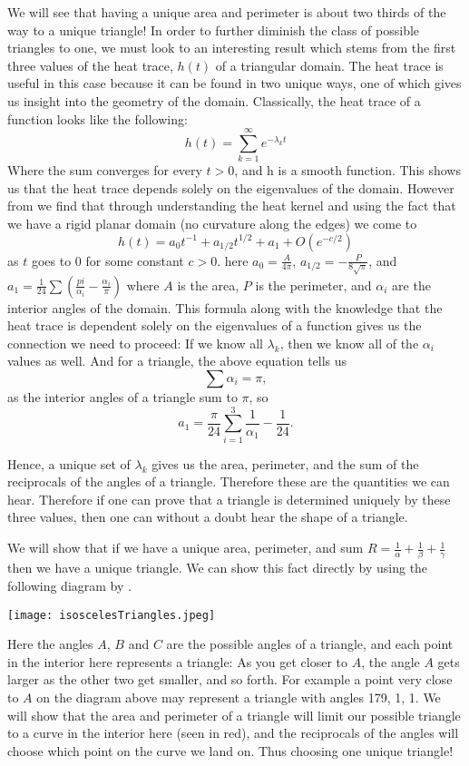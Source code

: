 \documentclass[12pt]{report}
\numberwithin{definition}{section}
\begin{document}
We will see that having a unique area and perimeter is about two thirds of the way to a unique triangle! In order to further diminish the class of possible triangles to one, we must look to an interesting result which stems from the first three values of the heat trace, $h(t)$ of a triangular domain. The heat trace is useful in this case because it can be found in two unique ways, one of which gives us insight into the geometry of the domain. Classically, the heat trace of a function looks like the following:
\[
h(t) = \sum^\infty_{k=1} e^{-\lambda_kt}
\]
 Where the sum converges for every $t>0$, and h is a smooth function. This shows us that the heat trace depends solely on the eigenvalues of the domain. However from \cite{Van} we find that through understanding the heat kernel and using the fact that  we have a rigid planar domain (no curvature along the edges) we come to 
\[
h(t) = a_0t^{-1}+a_{1/2}t^{1/2}+a_1+O(e^{-c/2} )
\]
as $t$ goes to $0$ for some constant $c>0$. here $a_0 = \frac{A}{4\pi}$, $a_{1/2} = -\frac{P}{8\sqrt{\pi}}$, and $a_1 = \frac{1}{24}\sum(\frac{pi}{\alpha_i}-\frac{\alpha_i}{\pi})$ where $A$ is the area, $P$ is the perimeter, and $\alpha_i$ are the interior angles of the domain. This formula along with the knowledge that the heat trace is dependent solely on the eigenvalues of a function gives us the connection we need to proceed: 
If we know all $\lambda_k$, then we know all of the $\alpha_i$ values as well. And for a triangle, the above equation tells us 
\[
\sum \alpha_i = \pi,
\]
as the interior angles of a triangle sum to $\pi$, so 
\[
a_1 = \frac{\pi}{24} \sum^3_{i=1} \frac{1}{\alpha_1}-\frac{1}{24}.
\]

Hence, a unique set of $\lambda_k$ gives us the area, perimeter, and the sum of the reciprocals of the angles of a triangle. Therefore these are the quantities we can hear. Therefore if one can prove that a triangle is determined uniquely by these three values, then one can without a doubt hear the shape of a triangle. 

We will show that if we have  a unique area, perimeter, and sum $R = \frac{1}{\alpha}+\frac{1}{\beta}+\frac{1}{\gamma}$ then we have a unique triangle. We can show this fact directly by using the following diagram by \cite{Grieser}. 
	
	  
	
\texttt{[image: isoscelesTriangles.jpeg]}

  


Here the angles $A$, $B$ and $C$ are the possible angles of a triangle, and each point in the interior here represents a triangle: As you get closer to $A$, the angle $A$ gets larger as the other two get smaller, and so forth. For example a point very close to $A$ on the diagram above may represent a triangle with angles 179, 1, 1. We will show that the area and perimeter of a triangle will limit our possible triangle to a curve in the interior here (seen in red), and the reciprocals of the angles will choose which point on the curve we land on. Thus choosing one unique triangle! 
\end{document}
